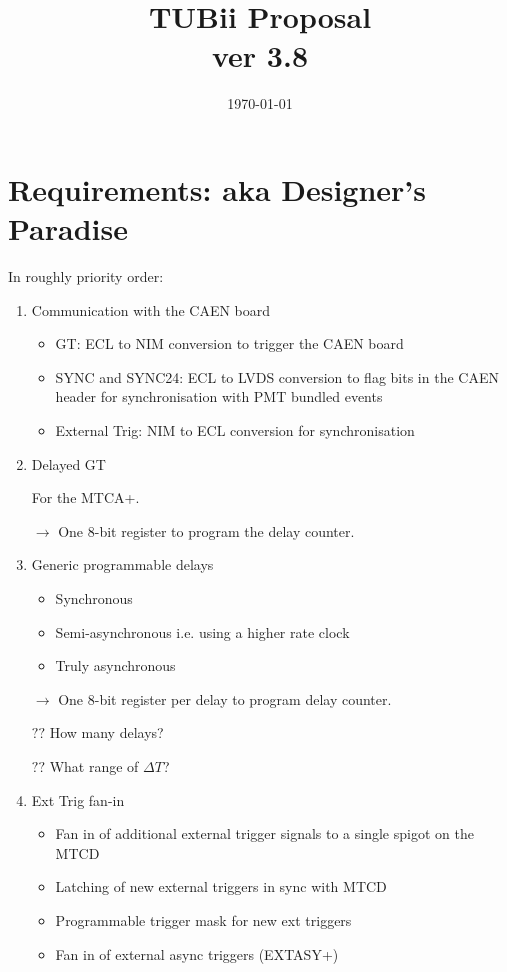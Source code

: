 \documentclass[letter, 11pt]{article}
\title{TUBii Proposal \\ \small{ver 3.8}}
\date{\today}
\begin{document}
\maketitle
\tableofcontents

\section{Requirements: aka Designer's Paradise}

In roughly priority order:
\begin{enumerate}
\item Communication with the CAEN board

\begin{itemize}
\item GT: ECL to NIM conversion to trigger the CAEN board
\item SYNC and SYNC24: ECL to LVDS conversion to flag bits in the CAEN header for synchronisation with PMT bundled events
\item External Trig: NIM to ECL conversion for synchronisation
\end{itemize}

\item Delayed GT

For the MTCA+.

$\rightarrow$ One 8-bit register to program the delay counter.

\item Generic programmable delays

\begin{itemize}
\item Synchronous
\item Semi-asynchronous i.e. using a higher rate clock
\item Truly asynchronous
\end{itemize}

$\rightarrow$ One 8-bit register per delay to program delay counter.

$??$ How many delays?

$??$ What range of $\Delta T$?

\item Ext Trig fan-in

\begin{itemize}
\item Fan in of additional external trigger signals to a single spigot on the MTCD
\item Latching of new external triggers in sync with MTCD
\item Programmable trigger mask for new ext triggers
\item Fan in of external async triggers (EXTASY+)
\end{itemize}


\end{enumerate}
\end{document}
